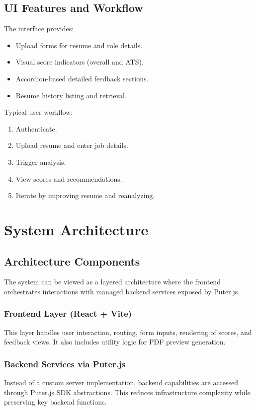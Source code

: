 \documentclass[12pt,a4paper]{report}
\begin{document}
\section{UI Features and Workflow}
The interface provides:
\begin{itemize}[leftmargin=1.2cm]
    \item Upload forms for resume and role details.
    \item Visual score indicators (overall and ATS).
    \item Accordion-based detailed feedback sections.
    \item Resume history listing and retrieval.
\end{itemize}

Typical user workflow:
\begin{enumerate}[leftmargin=1.2cm]
    \item Authenticate.
    \item Upload resume and enter job details.
    \item Trigger analysis.
    \item View scores and recommendations.
    \item Iterate by improving resume and reanalyzing.
\end{enumerate}

\chapter{System Architecture}
\section{Architecture Components}
The system can be viewed as a layered architecture where the frontend orchestrates interactions with managed backend services exposed by Puter.js.

\subsection{Frontend Layer (React + Vite)}
This layer handles user interaction, routing, form inputs, rendering of scores, and feedback views. It also includes utility logic for PDF preview generation.

\subsection{Backend Services via Puter.js}
Instead of a custom server implementation, backend capabilities are accessed through Puter.js SDK abstractions. This reduces infrastructure complexity while preserving key backend functions.
\end{document}
